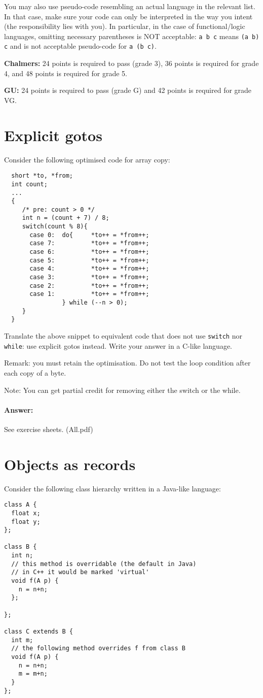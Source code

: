 \documentclass{article}
\newcommand{\answer}[0]{\paragraph{Answer:}}
\begin{document}
You may also use pseudo-code resembling an actual language in the
relevant list. In that case, make sure your code can only be
interpreted in the way you intent (the responsibility lies with
you). In particular, in the case of functional/logic languages,
omitting necessary parentheses is NOT acceptable: \texttt{a b c} means
\texttt{(a b) c} and is not acceptable pseudo-code for \texttt{a (b
  c)}.


\textbf{Chalmers:}
24 points is required to pass (grade 3), 36 points is required for
grade 4, and 48 points is required for grade 5.

\textbf{GU:}
24 points is required to pass (grade G) and 42 points is
required for grade VG.

\section{Explicit gotos}

Consider the following optimised code for array copy:
\begin{verbatim}
  short *to, *from;
  int count;
  ...
  {
     /* pre: count > 0 */
     int n = (count + 7) / 8;
     switch(count % 8){
       case 0:	do{     *to++ = *from++;
       case 7:	        *to++ = *from++;
       case 6:	        *to++ = *from++;
       case 5:	        *to++ = *from++;
       case 4:	        *to++ = *from++;
       case 3:	        *to++ = *from++;
       case 2:	        *to++ = *from++;
       case 1:	        *to++ = *from++;
                } while (--n > 0);
     }
  }
\end{verbatim}

Translate the above snippet to equivalent code that does not use
\texttt{switch} nor \texttt{while}: use explicit gotos instead.
Write your answer in a C-like language.

Remark: you must retain the optimisation. Do not test the loop
condition after each copy of a byte.

Note: You can get partial credit for removing either the switch or the
while.
\answer{See exercise sheets. (All.pdf)}
\newpage
\section{Objects as records}

Consider the following class hierarchy written in a Java-like
language:
\begin{verbatim}
class A {
  float x;
  float y;
};

class B {
  int n;
  // this method is overridable (the default in Java)
  // in C++ it would be marked 'virtual'
  void f(A p) {
    n = n+n;
  };

};

class C extends B {
  int m;
  // the following method overrides f from class B
  void f(A p) {
    n = n+n;
    m = m+n;
  }
};
\end{verbatim}
\end{document}
